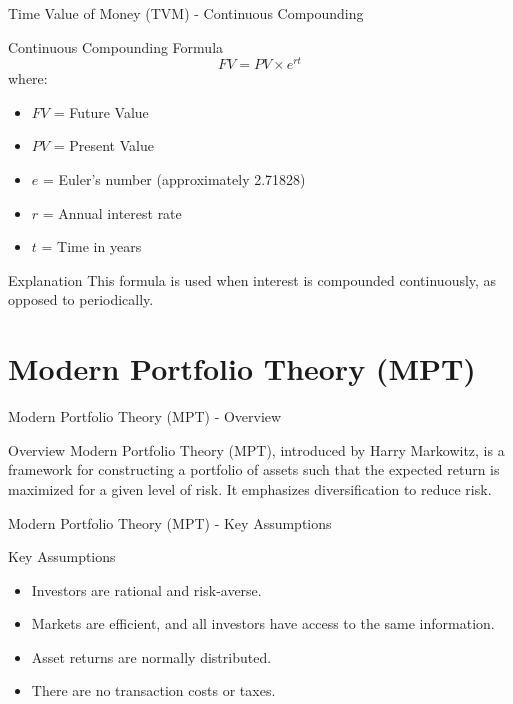 \documentclass{beamer}
\begin{document}
\begin{frame}{Time Value of Money (TVM) - Continuous Compounding}
  \begin{block}{Continuous Compounding Formula}
    \begin{equation*}
      FV = PV \times e^{rt}
    \end{equation*}
    where:
    \begin{itemize}
      \item \( FV \) = Future Value
      \item \( PV \) = Present Value
      \item \( e \) = Euler's number (approximately 2.71828)
      \item \( r \) = Annual interest rate
      \item \( t \) = Time in years
    \end{itemize}
  \end{block}
  \begin{block}{Explanation}
    This formula is used when interest is compounded continuously, as opposed to periodically.
  \end{block}
\end{frame}

\section{Modern Portfolio Theory (MPT)}
\begin{frame}{Modern Portfolio Theory (MPT) - Overview}
  \begin{block}{Overview}
    Modern Portfolio Theory (MPT), introduced by Harry Markowitz, is a framework for constructing a portfolio of assets such that the expected return is maximized for a given level of risk. It emphasizes diversification to reduce risk.
  \end{block}
\end{frame}

\begin{frame}{Modern Portfolio Theory (MPT) - Key Assumptions}
  \begin{block}{Key Assumptions}
    \begin{itemize}
      \item Investors are rational and risk-averse.
      \item Markets are efficient, and all investors have access to the same information.
      \item Asset returns are normally distributed.
      \item There are no transaction costs or taxes.
    \end{itemize}
  \end{block}
\end{frame}
\end{document}
